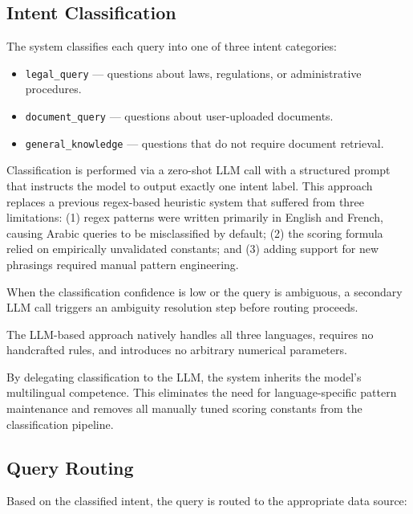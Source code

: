 \documentclass[12pt, a4paper]{article}
\begin{document}
\subsection{Intent Classification}

The system classifies each query into one of three intent categories:

\begin{itemize}[leftmargin=1.8em, itemsep=0.25em]
  \item \texttt{legal\_query} --- questions about laws, regulations, or administrative
        procedures.
  \item \texttt{document\_query} --- questions about user-uploaded documents.
  \item \texttt{general\_knowledge} --- questions that do not require document retrieval.
\end{itemize}

Classification is performed via a zero-shot LLM call with a structured prompt
that instructs the model to output exactly one intent label. This approach
replaces a previous regex-based heuristic system that suffered from three
limitations: (1) regex patterns were written primarily in English and French,
causing Arabic queries to be misclassified by default; (2) the scoring formula
relied on empirically unvalidated constants; and (3) adding support for new
phrasings required manual pattern engineering.

When the classification confidence is low or the query is ambiguous, a secondary
LLM call triggers an ambiguity resolution step before routing proceeds.

The LLM-based approach natively handles all three languages, requires no
handcrafted rules, and introduces no arbitrary numerical parameters.

\begin{notebox}
By delegating classification to the LLM, the system inherits the model's
multilingual competence. This eliminates the need for language-specific
pattern maintenance and removes all manually tuned scoring constants from
the classification pipeline.
\end{notebox}

\subsection{Query Routing}

Based on the classified intent, the query is routed to the appropriate data source:
\end{document}
